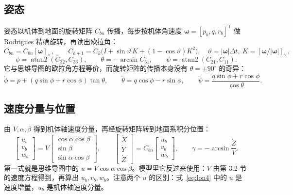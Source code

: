 \documentclass[UTF8,a4paper,11pt,fontset=fandol,scheme=plain]{ctexart}
\begin{document}
\subsection{姿态}
姿态以机体到地面的旋转矩阵 \(C_{bn}\) 传播，每步按机体角速度 \(\bm\omega=[p_b,q,r_b]^{\mathsf T}\) 做 Rodrigues 精确旋转，再读出欧拉角：
\begin{equation}
\dot C_{bn}=C_{bn}[\bm\omega]_\times,\qquad C_{k+1}=C_k\bigl(I+\sin\vartheta\,K+(1-\cos\vartheta)K^2\bigr),\quad \vartheta=|\bm\omega|\Delta t,\ K=[\bm\omega/|\bm\omega|]_\times ,
\end{equation}
\begin{equation}
\phi=\operatorname{atan2}(C_{32},C_{33}),\qquad \theta=-\arcsin C_{31},\qquad \psi=\operatorname{atan2}(C_{21},C_{11}).
\end{equation}
它与思维导图的欧拉角方程等价，而旋转矩阵的传播本身没有 \(\theta=\pm90^\circ\) 的奇异：
\begin{equation}
\dot\phi=p+(q\sin\phi+r\cos\phi)\tan\theta,\qquad \dot\theta=q\cos\phi-r\sin\phi,\qquad \dot\psi=\frac{q\sin\phi+r\cos\phi}{\cos\theta}.
\end{equation}

\subsection{速度分量与位置}
由 \(V,\alpha,\beta\) 得到机体轴速度分量，再经旋转矩阵转到地面系积分位置：
\begin{equation}
\begin{bmatrix}u_b\\ v_b\\ w_b\end{bmatrix}=V\begin{bmatrix}\cos\alpha\cos\beta\\ \sin\beta\\ \sin\alpha\cos\beta\end{bmatrix},\qquad
\begin{bmatrix}\dot X\\ \dot Y\\ \dot Z\end{bmatrix}=C_{bn}\begin{bmatrix}u_b\\ v_b\\ w_b\end{bmatrix},\qquad \gamma=-\arcsin\frac{\dot Z}{V}.
\end{equation}
第一式就是思维导图中的 \(u=V\cos\alpha\cos\beta\)。模型里它反过来使用：\(V\) 由第 3.2 节的速度方程得到，再算出 \(u_b,v_b,w_b\)。注意两个 \(u\) 的区别：式~\eqref{eq:lon4} 中的 \(u\) 是速度增量，\(u_b\) 是机体轴速度分量。
\end{document}
